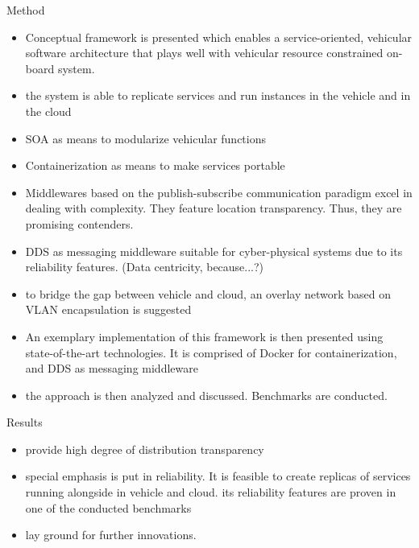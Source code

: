 Method
\begin{itemize}
\item  Conceptual framework is presented which enables a service-oriented, vehicular software architecture that plays well with vehicular resource constrained on-board system.
\item the system is able to replicate services and run instances in the vehicle and in the cloud
\item SOA as means to modularize vehicular functions 
\item Containerization as means to make services portable
\item Middlewares based on the publish-subscribe communication paradigm excel in dealing with complexity. They feature location transparency. Thus, they are promising contenders. 
\item DDS as messaging middleware suitable for cyber-physical systems due to its reliability features. (Data centricity, because...?)
\item to bridge the gap between vehicle and cloud, an overlay network based on VLAN encapsulation is suggested
\item  An exemplary implementation of this framework is then presented using state-of-the-art technologies. It is comprised of Docker for containerization, and DDS as messaging middleware
\item the approach is then analyzed and discussed. Benchmarks are conducted.
\end{itemize}


Results
\begin{itemize}
\item provide high degree of distribution transparency
\item special emphasis is put in reliability. It is feasible to create replicas of services running alongside in vehicle and cloud.
its reliability features are proven in one of the conducted benchmarks
\item lay ground for further innovations.
\end{itemize}
